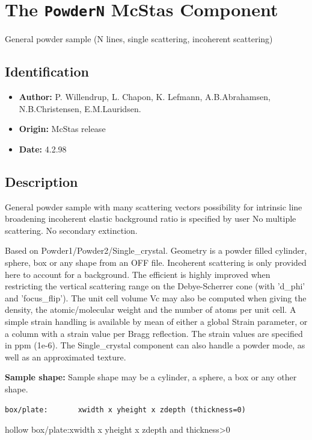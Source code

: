 \section{The \texttt{PowderN} McStas Component}
General powder sample (N lines, single scattering, incoherent scattering)

\subsection*{Identification}
\begin{itemize}
  \item \textbf{Author:} P. Willendrup, L. Chapon, K. Lefmann, A.B.Abrahamsen, N.B.Christensen, E.M.Lauridsen.
  \item \textbf{Origin:} McStas release
  \item \textbf{Date:} 4.2.98
\end{itemize}

\subsection*{Description}
General powder sample with many scattering vectors possibility for intrinsic line broadening incoherent elastic background ratio is specified by user No multiple scattering. No secondary extinction.

Based on Powder1/Powder2/Single\_crystal. Geometry is a powder filled cylinder, sphere, box or any shape from an OFF file. Incoherent scattering is only provided here to account for a background. The efficient is highly improved when restricting the vertical scattering range on the Debye-Scherrer cone (with 'd\_phi' and 'focus\_flip'). The unit cell volume Vc may also be computed when giving the density, the atomic/molecular weight and the number of atoms per unit cell. A simple strain handling is available by mean of either a global Strain parameter, or a column with a strain value per Bragg reflection. The strain values are specified in ppm (1e-6). The Single\_crystal component can also handle a powder mode, as well as an approximated texture.

\textbf{Sample shape:} Sample shape may be a cylinder, a sphere, a box or any other shape.

\begin{verbatim}
box/plate:       xwidth x yheight x zdepth (thickness=0)
\end{verbatim}

hollow box/plate:xwidth x yheight x zdepth and thickness\textgreater{}0

